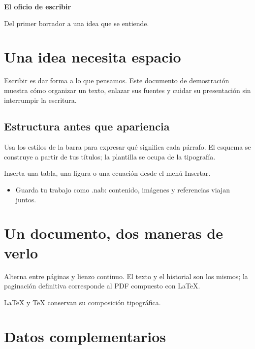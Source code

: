\documentclass[12pt,a4paper]{article}
\begin{document}
\begin{abstract}Prueba tipográfica de \LaTeX{}: español, áéíóú y referencias.\end{abstract}
\fontsize{12.0}{14.399999999999999}\selectfont
{\LARGE\bfseries El oficio de escribir\par}

{\large Del primer borrador a una idea que se entiende.\par}

\section{Una idea necesita espacio}\label{b87681FCB-9417-4C2C-BB31-CA3246651C69}

Escribir es dar forma a lo que pensamos. Este documento de demostración muestra cómo organizar un texto, enlazar sus fuentes y cuidar su presentación sin interrumpir la escritura.

\subsection{Estructura antes que apariencia}\label{b4751D224-E4FD-4977-ABA4-FE276E499549}

Usa los estilos de la barra para expresar qué significa cada párrafo. El esquema se construye a partir de tus títulos; la plantilla se ocupa de la tipografía.

Inserta una tabla, una figura o una ecuación desde el menú Insertar.

\begin{itemize}
\item Guarda tu trabajo como .nab: contenido, imágenes y referencias viajan juntos.

\end{itemize}
\section{Un documento, dos maneras de verlo}\label{bB6F99D17-154C-42F3-A532-6AEF5F51E682}

Alterna entre páginas y lienzo continuo. El texto y el historial son los mismos; la paginación definitiva corresponde al PDF compuesto con \LaTeX{}.

\LaTeX{} y \TeX{} conservan su composición tipográfica.

\appendix
\section{Datos complementarios}\label{b5F11EB3E-950E-46D8-A88F-90D2FB62F78F}
\end{document}
